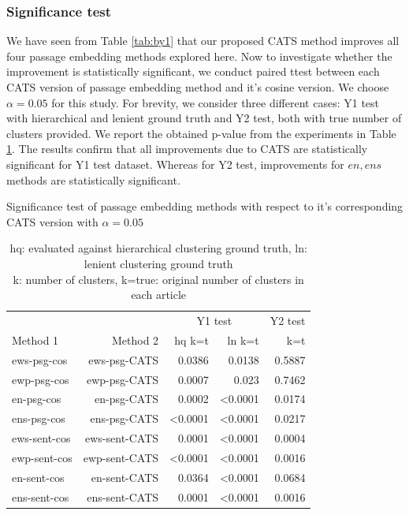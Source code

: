\documentclass[sigconf,authordraft]{acmart}
\begin{document}
\subsubsection{Significance test} We have seen from Table \ref{tab:by1} that our proposed CATS method improves all four passage embedding methods explored here. Now to investigate whether the improvement is statistically significant, we conduct paired ttest between each CATS version of passage embedding method and it's cosine version. We choose $\alpha = 0.05$ for this study. For brevity, we consider three different cases: Y1 test with hierarchical and lenient ground truth and Y2 test, both with true number of clusters provided. We report the obtained p-value from the experiments in Table \ref{tab:sigt}. The results confirm that all improvements due to CATS are statistically significant for Y1 test dataset. Whereas for Y2 test, improvements for $en, ens$ methods are statistically significant.
\begin{table}[t]
\centering
\caption{Significance test of passage embedding methods with respect to it's corresponding CATS version with $\alpha = 0.05$}
\label{tab:sigt}
\begin{tabular}{@{}lrrrr@{}}\toprule
&& \multicolumn{2}{c}{Y1 test} & Y2 test  \\
\cmidrule(r){3-4}
\cmidrule(r){5-5}
Method 1 & Method 2 & hq k=t & ln k=t & k=t \\\midrule
ews-psg-cos & ews-psg-CATS & 0.0386 & 0.0138 & 0.5887 \\ 
ewp-psg-cos & ewp-psg-CATS & 0.0007 & 0.023 & 0.7462 \\ 
en-psg-cos & en-psg-CATS & 0.0002 & <0.0001 & 0.0174 \\ 
ens-psg-cos & ens-psg-CATS & <0.0001 & <0.0001 & 0.0217 \\
ews-sent-cos & ews-sent-CATS & 0.0001 & <0.0001 & 0.0004 \\
ewp-sent-cos & ewp-sent-CATS & <0.0001 & <0.0001 & 0.0016 \\
en-sent-cos & en-sent-CATS & 0.0364 & <0.0001 & 0.0684 \\
ens-sent-cos & ens-sent-CATS & 0.0001 & <0.0001 & 0.0016 \\
\bottomrule
\end{tabular}
\caption*{hq: evaluated against hierarchical clustering ground truth, ln: lenient clustering ground truth\\
k: number of clusters, k=true: original number of clusters in each article}
\end{table}
\end{document}

